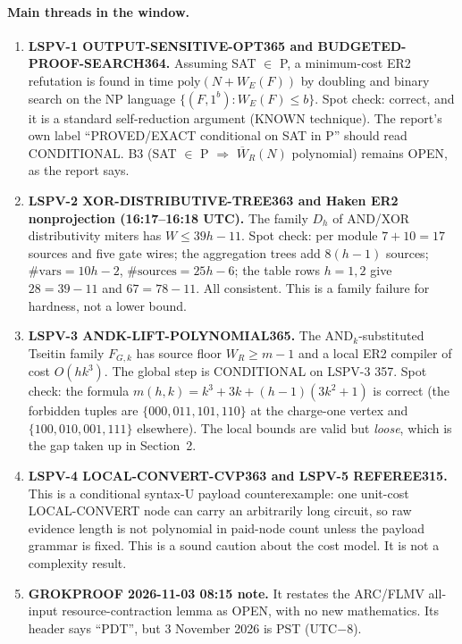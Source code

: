 \documentclass[11pt]{article}
\begin{document}
\paragraph{Main threads in the window.}
\begin{enumerate}
\item \textbf{LSPV-1 OUTPUT-SENSITIVE-OPT365 and BUDGETED-PROOF-SEARCH364.} Assuming SAT $\in$ P, a minimum-cost ER2 refutation is found in time $\mathrm{poly}(N+W_E(F))$ by doubling and binary search on the NP language $\{(F,1^b):W_E(F)\le b\}$. Spot check: correct, and it is a standard self-reduction argument (KNOWN technique). The report's own label ``PROVED/EXACT conditional on SAT in P'' should read CONDITIONAL. B3 (SAT $\in$ P $\Rightarrow$ $\overline W_{R}(N)$ polynomial) remains OPEN, as the report says.
\item \textbf{LSPV-2 XOR-DISTRIBUTIVE-TREE363 and Haken ER2 nonprojection (16:17--16:18 UTC).} The family $D_h$ of AND/XOR distributivity miters has $W\le 39h-11$. Spot check: per module $7+10=17$ sources and five gate wires; the aggregation trees add $8(h-1)$ sources; $\#\text{vars}=10h-2$, $\#\text{sources}=25h-6$; the table rows $h=1,2$ give $28=39-11$ and $67=78-11$. All consistent. This is a family failure for hardness, not a lower bound.
\item \textbf{LSPV-3 ANDK-LIFT-POLYNOMIAL365.} The AND$_k$-substituted Tseitin family $F_{G,k}$ has source floor $W_R\ge m-1$ and a local ER2 compiler of cost $O(hk^3)$. The global step is CONDITIONAL on LSPV-3 357. Spot check: the formula $m(h,k)=k^3+3k+(h-1)(3k^2+1)$ is correct (the forbidden tuples are $\{000,011,101,110\}$ at the charge-one vertex and $\{100,010,001,111\}$ elsewhere). The local bounds are valid but \emph{loose}, which is the gap taken up in Section~2.
\item \textbf{LSPV-4 LOCAL-CONVERT-CVP363 and LSPV-5 REFEREE315.} This is a conditional syntax-U payload counterexample: one unit-cost LOCAL-CONVERT node can carry an arbitrarily long circuit, so raw evidence length is not polynomial in paid-node count unless the payload grammar is fixed. This is a sound caution about the cost model. It is not a complexity result.
\item \textbf{GROKPROOF 2026-11-03 08:15 note.} It restates the ARC/FLMV all-input resource-contraction lemma as OPEN, with no new mathematics. Its header says ``PDT'', but 3 November 2026 is PST (UTC$-8$).
\end{enumerate}
\end{document}

